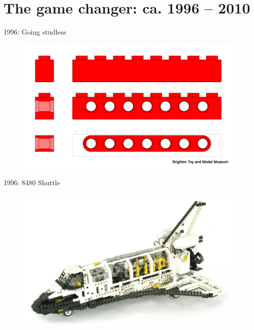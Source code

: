 \documentclass[xcolor=dvipsnames]{beamer}
\begin{document}
\section{The game changer: ca. 1996 -- 2010}

\begin{frame}[fragile]{1996: Going studless}
\begin{figure}[H]
 \centering
 \includegraphics[width=0.99\textwidth]{1996_brick_studded_studless.jpg}
\end{figure}
\end{frame}

\begin{frame}[fragile]{1996: 8480 Shuttle}
\begin{figure}[H]
 \centering
 \includegraphics[width=0.99\textwidth]{1996_8480_shuttle.jpg}
\end{figure}
\end{frame}
\end{document}
